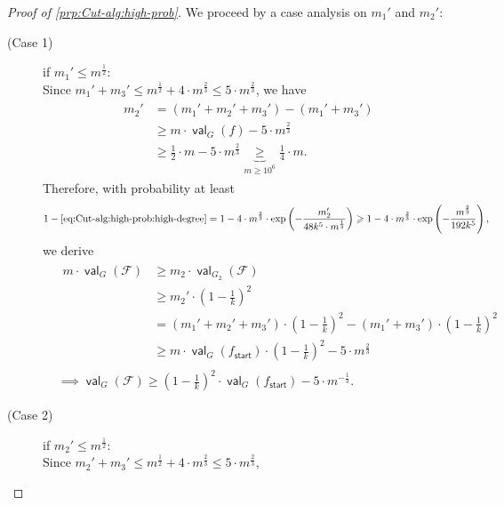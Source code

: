 \documentclass[11pt,fleqn]{article}
\renewcommand{\geq}{\geqslant}
\renewcommand{\leq}{\leqslant}
\DeclareMathOperator{\val}{\mathsf{val}}
\newcommand{\sss}{\mathsf{start}}
\newcommand{\f}{f}
\newcommand{\sqcol}{\scrF}
\newcommand{\scrF}{\mathscr{F}}
\theoremstyle{definition}
\numberwithin{equation}{section}
\begin{document}
\begin{proof}[Proof of \cref{prp:Cut-alg:high-prob}]
We proceed by a case analysis on $m_1'$ and $m_2'$:
\begin{description}
    \item[(Case 1)] if $m_1' \leq m^\frac{1}{2}$: \\
        Since $m_1' + m_3' \leq m^\frac{1}{2} + 4 \cdot m^\frac{2}{3} \leq 5 \cdot m^\frac{2}{3}$,
        we have
        \begin{align}
        \begin{aligned}
            m_2'
            & = (m_1'+m_2'+m_3') - (m_1'+m_3') \\
            & \geq m\cdot \val_G(f) - 5 \cdot m^\frac{2}{3} \\
            & \geq \tfrac{1}{2} \cdot m - 5 \cdot m^\frac{2}{3}
            \underbrace{\geq}_{m \geq 10^6} \tfrac{1}{4} \cdot m.
        \end{aligned}
        \end{align}
        Therefore, with probability at least
        \begin{align}
            1 - \text{\cref{eq:Cut-alg:high-prob:high-degree}}
            = 1 - 4 \cdot m^{\frac{2}{3}} \cdot \exp\left(
                -\frac{m_2'}{48 k^5 \cdot m^\frac{1}{3}}
            \right)
            \geq 1 - 4 \cdot m^{\frac{2}{3}} \cdot \exp\left(
                -\frac{m^\frac{2}{3}}{192 k^5}
            \right),
        \end{align}
        we derive
        \begin{align}
        &
        \begin{aligned}
            m \cdot \val_G(\sqcol)
            & \geq m_2 \cdot \val_{G_2}(\sqcol) \\
            & \geq m_2' \cdot \left(1-\tfrac{1}{k}\right)^2 \\
            & = (m_1'+m_2'+m_3') \cdot \left(1-\tfrac{1}{k}\right)^2
                - (m_1'+m_3') \cdot \left(1-\tfrac{1}{k}\right)^2 \\
            & \geq m \cdot \val_G(\f_\sss) \cdot \left(1-\tfrac{1}{k}\right)^2 - 5 \cdot m^\frac{2}{3}
        \end{aligned} \\
        & \implies \val_G(\sqcol)
            \geq \left(1-\tfrac{1}{k}\right)^2 \cdot \val_G(\f_\sss) - 5 \cdot m^{-\frac{1}{3}}.
        \end{align}
    \item[(Case 2)] if $m_2' \leq m^\frac{1}{2}$: \\
        Since $m_2' + m_3' \leq m^\frac{1}{2} + 4 \cdot m^\frac{2}{3} \leq 5 \cdot m^\frac{2}{3}$,

\end{description}
\end{proof}
\end{document}
